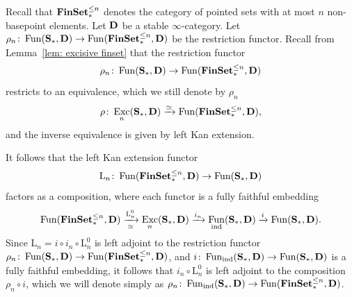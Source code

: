\documentclass[psamsfonts]{amsart}
\theoremstyle{plain}
\newtheorem{lem}[thm]{Lemma}
\theoremstyle{definition}
\theoremstyle{remark}
\newcommand{\catname}[1]{{\normalfont\textbf{#1}}}
\newcommand{\finset}{\catname{FinSet}_*}
\newcommand{\spaces}{\catname{S}_*}
\newcommand{\ch}{\catname{Ch}}
\newcommand{\lkan}{\mathrm{L}}
\DeclareMathOperator{\fun}{Fun}
\DeclareMathOperator{\exc}{Exc}
\begin{document}
Recall that $\finset^{\le n}$ denotes the category of pointed sets with at most $n$ non-basepoint elements. Let $\catname{D}$ be a stable $\infty$-category. Let $\rho_n\colon\fun(\spaces, \catname{D})\to \fun(\finset^{\le n}, \catname{D})$ be the restriction functor. 
Recall from Lemma~\ref{lem: excisive finset} that
the restriction functor   
\[
\rho_n\colon\fun(\spaces, \catname{D})\to \fun(\finset^{\le n}, \catname{D})
\]
restricts to an equivalence, which we still denote by $\rho_n$
\[
\rho\colon\exc_n(\spaces, \catname{D})\xrightarrow{\simeq} \fun(\finset^{\le n}, \catname{D}),
\]
and the inverse equivalence is given by left Kan extension.


It follows that the left Kan extension functor
\[
\lkan_n\colon\fun(\finset^{\le n}, \catname{D}) \to \fun(\spaces, \catname{D})
\]
factors as a composition, where each functor is a fully faithful embedding
\[
\fun(\finset^{\le n}, \catname{D}) \xrightarrow[\simeq]{\lkan_n^0}\exc_n(\spaces, \catname{D}) \xrightarrow{i_n}\fun_{\operatorname{ind}}(\spaces, \catname{D})\xrightarrow{i} \fun(\spaces, \catname{D}).
\]
Since $\lkan_n=i\circ i_n \circ \lkan_n^0$ is left adjoint 
to the restriction functor $\rho_n\colon\fun(\spaces, \catname{D})\to \fun(\finset^{\le n}, \catname{D})$, and $i\colon \fun_{\operatorname{ind}}(\spaces, \catname{D})\to \fun(\spaces, \catname{D})$ is a fully faithful embedding, it follows that $i_n\circ \lkan_n^0$ is left adjoint to the composition $\rho_n\circ i$, which we will denote simply as $\rho_n\colon\fun_{\operatorname{ind}}(\spaces, \catname{D})\to \fun(\finset^{\le n}, \catname{D})$.
\end{document}
